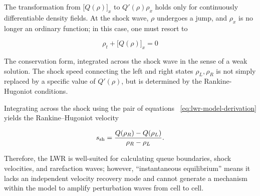 \documentclass[11pt,a4paper,openany]{book}
\numberwithin{equation}{chapter}
\numberwithin{figure}{chapter}
\numberwithin{table}{chapter}
\begin{document}
\begin{tcolorbox}[notebox,title=\textbf{Why must the conservation formula be maintained?}]

The transformation from $\bigl[Q(\rho)\bigr]_x$ to $Q'(\rho)\rho_x$ holds only for continuously differentiable density fields. At the shock wave, $\rho$ undergoes a jump, and $\rho_x$ is no longer an ordinary function; in this case, one must resort to

\[
\rho_t+\bigl[Q(\rho)\bigr]_x=0
\]




The conservation form, integrated across the shock wave in the sense of a weak solution. The shock speed connecting the left and right states $\rho_L,\rho_R$ is not simply replaced by a specific value of $Q'(\rho)$, but is determined by the Rankine-Hugoniot conditions.






























\end{tcolorbox}







Integrating across the shock using the pair of equations ~\eqref{eq:lwr-model-derivation} yields the Rankine–Hugoniot velocity

\begin{equation}
s_{\rm sh}
=\frac{Q(\rho_R)-Q(\rho_L)}{\rho_R-\rho_L}.
\label{eq:lwr-rh-model}
\end{equation}

Therefore, the LWR is well-suited for calculating queue boundaries, shock velocities, and rarefaction waves; however, “instantaneous equilibrium” means it lacks an independent velocity recovery mode and cannot generate a mechanism within the model to amplify perturbation waves from cell to cell.
\end{document}
